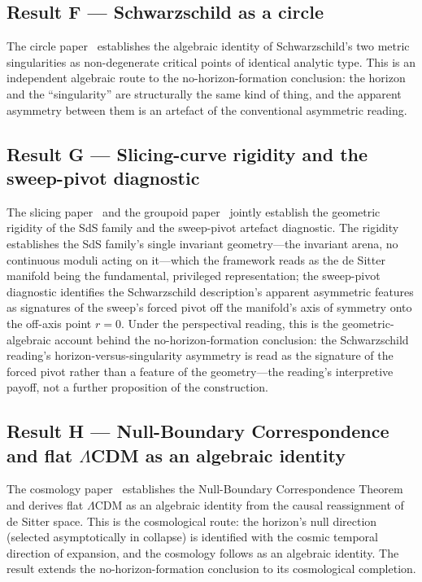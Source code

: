 \documentclass[11pt,a4paper]{article}
\theoremstyle{definition}
\begin{document}
\subsection{Result F --- Schwarzschild as a circle}\label{sec:result-F}

The circle paper~\cite{JanzenCircle} establishes the algebraic identity of Schwarzschild's two metric singularities as non-degenerate critical points of identical analytic type. This is an independent algebraic route to the no-horizon-formation conclusion: the horizon and the ``singularity'' are structurally the same kind of thing, and the apparent asymmetry between them is an artefact of the conventional asymmetric reading.

\subsection{Result G --- Slicing-curve rigidity and the sweep-pivot diagnostic}\label{sec:result-G}

The slicing paper~\cite{JanzenSlicing} and the groupoid paper~\cite{JanzenGroupoid} jointly establish the geometric rigidity of the SdS family and the sweep-pivot artefact diagnostic. The rigidity establishes the SdS family's single invariant geometry---the invariant arena, no continuous moduli acting on it---which the framework reads as the de Sitter manifold being the fundamental, privileged representation; the sweep-pivot diagnostic identifies the Schwarzschild description's apparent asymmetric features as signatures of the sweep's forced pivot off the manifold's axis of symmetry onto the off-axis point $r=0$. Under the perspectival reading, this is the geometric-algebraic account behind the no-horizon-formation conclusion: the Schwarzschild reading's horizon-versus-singularity asymmetry is read as the signature of the forced pivot rather than a feature of the geometry---the reading's interpretive payoff, not a further proposition of the construction.

\subsection{Result H --- Null-Boundary Correspondence and flat $\Lambda$CDM as an algebraic identity}\label{sec:result-H}

The cosmology paper~\cite{JanzenCRcosmology} establishes the Null-Boundary Correspondence Theorem and derives flat $\Lambda$CDM as an algebraic identity from the causal reassignment of de Sitter space. This is the cosmological route: the horizon's null direction (selected asymptotically in collapse) is identified with the cosmic temporal direction of expansion, and the cosmology follows as an algebraic identity. The result extends the no-horizon-formation conclusion to its cosmological completion.
\end{document}
